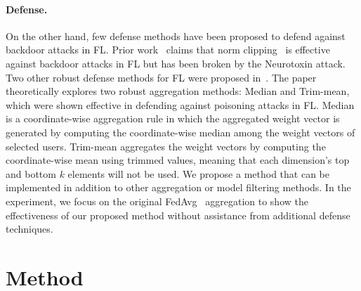 \documentclass{article} %
\newtheorem{definition}{Definition}
\begin{document}
\paragraph{Defense.} On the other hand, few defense methods have been proposed to defend against backdoor attacks in FL. Prior work~\cite{shejwalkar2022back} claims that norm clipping~\cite{sun2019can} is effective against backdoor attacks in FL but has been broken by the Neurotoxin attack. Two other robust defense methods for FL were proposed in~\cite{trim-mean}. The paper theoretically explores two robust aggregation methods: Median and Trim-mean, which were shown effective in defending against poisoning attacks in FL. Median is a coordinate-wise aggregation rule in which the aggregated weight vector is generated by computing the coordinate-wise median among the weight vectors of selected users. Trim-mean aggregates the weight vectors by computing the coordinate-wise mean using trimmed values, meaning that each dimension's top and bottom $k$ elements will not be used. We propose a method that can be implemented in addition to other aggregation or model filtering methods. In the experiment, we focus on the original FedAvg~\cite{fedavg} aggregation to show the effectiveness of our proposed method without assistance from additional defense techniques. 




%
\section{Method}
\end{document}
